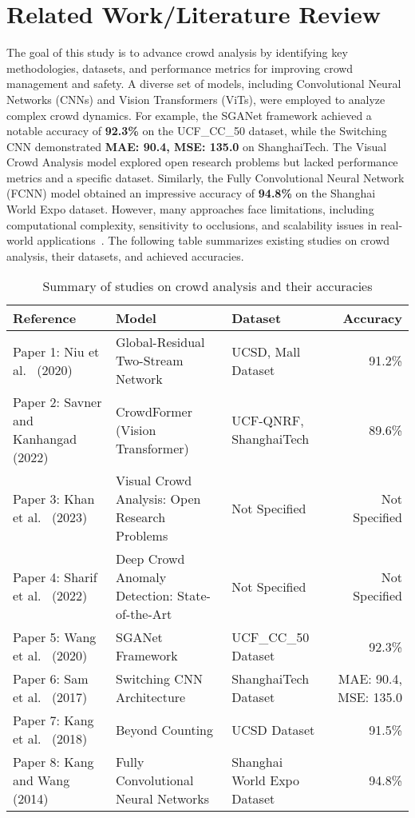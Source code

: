 \documentclass[runningheads]{llncs}
\begin{document}
	\section{Related Work/Literature Review}
	The goal of this study is to advance crowd analysis by identifying key methodologies, datasets, and performance metrics for improving crowd management and safety. A diverse set of models, including Convolutional Neural Networks (CNNs) and Vision Transformers (ViTs), were employed to analyze complex crowd dynamics. For example, the SGANet framework achieved a notable accuracy of \textbf{92.3\%} on the UCF\_CC\_50 dataset, while the Switching CNN demonstrated \textbf{MAE: 90.4, MSE: 135.0} on ShanghaiTech. The Visual Crowd Analysis model explored open research problems but lacked performance metrics and a specific dataset. Similarly, the Fully Convolutional Neural Network (FCNN) model obtained an impressive accuracy of \textbf{94.8\%} on the Shanghai World Expo dataset. However, many approaches face limitations, including computational complexity, sensitivity to occlusions, and scalability issues in real-world applications~\cite{videomae_hf}.
	The following table summarizes existing studies on crowd analysis, their datasets, and achieved accuracies.
	
	\begin{table*}[htbp]
		\caption{Summary of studies on crowd analysis and their accuracies}
		\centering
		\begin{tabular}{@{}lllr@{}}
			\toprule
			\textbf{Reference} & \textbf{Model} & \textbf{Dataset} & \textbf{Accuracy} \\ \midrule
			Paper 1: Niu et al.~\cite{niu2020overcrowdedness} (2020) & Global-Residual Two-Stream Network & UCSD, Mall Dataset & 91.2\% \\ 
			Paper 2: Savner and Kanhangad~\cite{savner2022crowdformer} (2022) & CrowdFormer (Vision Transformer) & UCF-QNRF, ShanghaiTech & 89.6\% \\ 
			Paper 3: Khan et al.~\cite{khan2023visualcrowdanalysis} (2023) & Visual Crowd Analysis: Open Research Problems & Not Specified & Not Specified \\        
			Paper 4: Sharif et al.~\cite{sharif2022deepcrowd} (2022) & Deep Crowd Anomaly Detection: State-of-the-Art & Not Specified & Not Specified \\         
			Paper 5: Wang et al.~\cite{wang2020crowdcountingsegmentation} (2020) & SGANet Framework & UCF\_CC\_50 Dataset & 92.3\% \\        
			Paper 6: Sam et al.~\cite{sam2017switchingconvolutional} (2017) & Switching CNN Architecture & ShanghaiTech Dataset & MAE: 90.4, MSE: 135.0 \\    
			Paper 7: Kang et al.~\cite{kang2018countingcomparison} (2018) & Beyond Counting & UCSD Dataset & 91.5\% \\        
			Paper 8: Kang and Wang~\cite{kang2014fullyconvolutionalneuralnetworks} (2014) & Fully Convolutional Neural Networks & Shanghai World Expo Dataset & 94.8\% \\         
			\bottomrule
		\end{tabular}
		\label{tab:studies_summary}
	\end{table*}
	
\end{document}
